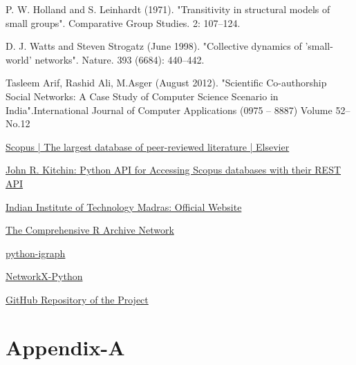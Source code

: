 \documentclass[conference,compsoc]{IEEEtran}
\begin{document}

%
%
%
\begin{thebibliography}{1}

 P. W. Holland and S. Leinhardt (1971). "Transitivity in structural models of small groups". Comparative Group Studies. 2: 107–124.

  D. J. Watts and Steven Strogatz (June 1998). "Collective dynamics of 'small-world' networks". Nature. 393 (6684): 440–442.

 Tasleem Arif, Rashid Ali, M.Asger (August 2012). "Scientific Co-authorship Social Networks: A Case Study of Computer Science Scenario in India".International Journal of Computer Applications (0975 – 8887) Volume 52– No.12

 \href{https://www.scopus.com/home.uri}{Scopus | The largest database of peer-reviewed literature | Elsevier}

 \href{https://github.com/jkitchin/scopus}{John R. Kitchin: Python API for Accessing Scopus databases with their REST API}

 \href{https://www.iitm.ac.in/}{Indian Institute of Technology Madras: Official Website}

 \href{https://cran.r-project.org/}{The Comprehensive R Archive Network}

 \href{http://igraph.org/python/}{python-igraph}

 \href{https://networkx.github.io/}{NetworkX-Python}

\href{https://github.com/ashutoshkrjha/EE5154_Repo}{GitHub Repository of the Project}
\end{thebibliography}

\section*{Appendix-A}
\end{document}
